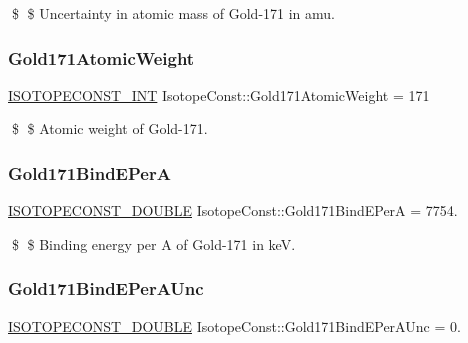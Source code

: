 \$ \$ Uncertainty in atomic mass of Gold-\/171 in amu. \mbox{\label{group___isotope_const-_gold-_au171_ga8cdd910a16dc07da5e0b66f2a47b4702}} 
\subsubsection{\texorpdfstring{Gold171\+Atomic\+Weight}{Gold171AtomicWeight}}
{\footnotesize\ttfamily \mbox{\hyperlink{group___isotope_const-_macros_ga5f18360b3e99483a35c32d789e62621c}{I\+S\+O\+T\+O\+P\+E\+C\+O\+N\+S\+T\+\_\+\+I\+NT}} Isotope\+Const\+::\+Gold171\+Atomic\+Weight = 171}

\$ \$ Atomic weight of Gold-\/171. \mbox{\label{group___isotope_const-_gold-_au171_ga2990b7293b9d0efc694bdd88f2a6767f}} 
\subsubsection{\texorpdfstring{Gold171\+Bind\+E\+PerA}{Gold171BindEPerA}}
{\footnotesize\ttfamily \mbox{\hyperlink{group___isotope_const-_macros_ga8f45a7272ce02c0b4c65c44636ed719a}{I\+S\+O\+T\+O\+P\+E\+C\+O\+N\+S\+T\+\_\+\+D\+O\+U\+B\+LE}} Isotope\+Const\+::\+Gold171\+Bind\+E\+PerA = 7754.}

\$ \$ Binding energy per A of Gold-\/171 in keV. \mbox{\label{group___isotope_const-_gold-_au171_ga16caaabc1c123f94f90929321789d07c}} 
\subsubsection{\texorpdfstring{Gold171\+Bind\+E\+Per\+A\+Unc}{Gold171BindEPerAUnc}}
{\footnotesize\ttfamily \mbox{\hyperlink{group___isotope_const-_macros_ga8f45a7272ce02c0b4c65c44636ed719a}{I\+S\+O\+T\+O\+P\+E\+C\+O\+N\+S\+T\+\_\+\+D\+O\+U\+B\+LE}} Isotope\+Const\+::\+Gold171\+Bind\+E\+Per\+A\+Unc = 0.}

